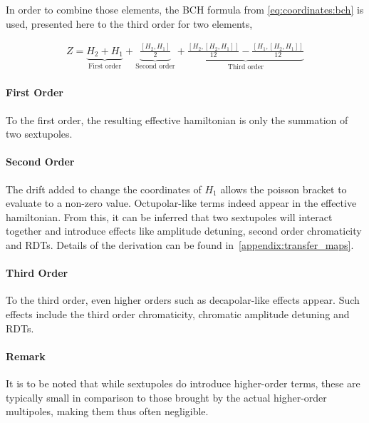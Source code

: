 In order to combine those elements, the BCH formula from \cref{eq:coordinates:bch} is used,
presented here to the third order for two elements,

\small
\begin{equation}
    \begin{aligned}
      Z = \underbrace{H_{2} + H_{1}}_{\text{First order}}
        + \underbrace{\frac{\left[H_{2},H_{1}\right]}{2}}_{\text{Second order}}
        + \underbrace{\frac{\left[H_{2},\left[H_{2},H_{1}\right]\right]}{12} - \frac{\left[H_{1},\left[H_{2},H_{1}\right]\right]}{12}}_{\text{Third order}}
    \end{aligned}
    \label{eq:coordinate_systems:bch_third_order_two_vars}
\end{equation}
\normalsize


\paragraph{First Order}

To the first order, the resulting effective hamiltonian is only the summation of two sextupoles.

\paragraph{Second Order}

The drift added to change the coordinates of $H_1$ allows the poisson bracket to evaluate to a
non-zero value. Octupolar-like terms indeed appear in the effective hamiltonian. From this, it can
be inferred that two sextupoles will interact together and introduce effects like amplitude
detuning, second order chromaticity and RDTs.
Details of the derivation can be found in~\cref{appendix:transfer_maps}.


\paragraph{Third Order}

To the third order, even higher orders such as decapolar-like effects appear. Such effects
include the third order chromaticity, chromatic amplitude detuning and RDTs.

\paragraph{Remark}

It is to be noted that while sextupoles do introduce higher-order terms, these are typically small
in comparison to those brought by the actual higher-order multipoles, making them thus often
negligible.